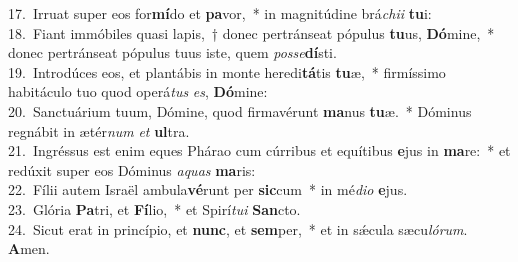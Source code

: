 {17.~}Irruat super eos for\textbf{mí}do et \textbf{pa}vor,~* in magnitúdine brá\textit{chi}\textit{i} \textbf{tu}i:\\
{18.~}Fiant immóbiles quasi lapis,~† donec pertránseat pópulus \textbf{tu}us, \textbf{Dó}mine,~* donec pertránseat pópulus tuus iste, quem \textit{pos}\textit{se}\textbf{dí}sti.\\
{19.~}Introdúces eos, et plantábis in monte heredi\textbf{tá}tis \textbf{tu}æ,~* firmíssimo habitáculo tuo quod operá\textit{tus} \textit{es}, \textbf{Dó}mine:\\
{20.~}Sanctuárium tuum, Dómine, quod firmavérunt \textbf{ma}nus \textbf{tu}æ.~* Dóminus regnábit in ætér\textit{num} \textit{et} \textbf{ul}tra.\\
{21.~}Ingréssus est enim eques Phárao cum cúrribus et equítibus \textbf{e}jus in \textbf{ma}re:~* et redúxit super eos Dóminus \textit{a}\textit{quas} \textbf{ma}ris:\\
{22.~}Fílii autem Israël ambula\textbf{vé}runt per \textbf{sic}cum~* in mé\textit{di}\textit{o} \textbf{e}jus.\\
{23.~}Glória \textbf{Pa}tri, et \textbf{Fí}lio,~* et Spirí\textit{tu}\textit{i} \textbf{San}cto.\\
{24.~}Sicut erat in princípio, et \textbf{nunc}, et \textbf{sem}per,~* et in sǽcula sæcu\textit{ló}\textit{rum}. \textbf{A}men.\\
